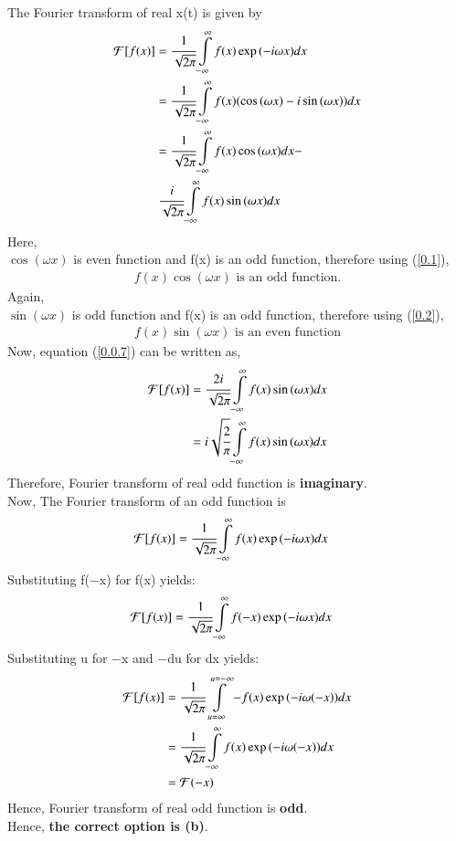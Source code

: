 \documentclass[journal,12pt,twocolumn]{IEEEtran}
\begin{document}
The Fourier transform of real x(t) is given by
\begin{align}
    \mathcal{F}[f(x)] &= \cfrac{1}{\sqrt{2\pi}}\displaystyle\int\limits_{-\infty}^{\infty} f(x)\exp{(-i\omega x)}dx\\
    &= \cfrac{1}{\sqrt{2\pi}}\displaystyle\int\limits_{-\infty}^{\infty} f(x)(\cos{(\omega x)} - i\sin{(\omega x)})dx\\
    &= \cfrac{1}{\sqrt{2\pi}}\displaystyle\int\limits_{-\infty}^{\infty} f(x)\cos{(\omega x)}dx -\nonumber \\ 
    &\text{ }\cfrac{i}{\sqrt{2\pi}}\displaystyle\int\limits_{-\infty}^{\infty} f(x)\sin{(\omega x)}dx \label{0.0.7}
\end{align}
Here, \\
$\cos{(\omega x)}$ is even function and f(x) is an odd function, therefore using (\ref{0.1}),
\begin{align}
    f(x)\cos{(\omega x)} \text{ is an odd function.}
\end{align}
Again,\\
$\sin{(\omega x)}$ is odd function and f(x) is an odd function, therefore using (\ref{0.2}),
\begin{align}
   f(x)\sin{(\omega x)} \text{ is an even function} 
\end{align}
Now, equation (\ref{0.0.7}) can be written as,
\begin{align}
    \mathcal{F}[f(x)] &= \cfrac{2i}{\sqrt{2\pi}}\displaystyle\int\limits_{-\infty}^{\infty} f(x)\sin{(\omega x)}dx\\
    &= i\sqrt{\cfrac{2}{\pi}}\displaystyle\int\limits_{-\infty}^{\infty} f(x)\sin{(\omega x)}dx
\end{align}
Therefore, Fourier transform of real odd function is \textbf{imaginary}.\\

Now,
The Fourier transform of an odd function is
\begin{align}
    \mathcal{F}[f(x)] &= \cfrac{1}{\sqrt{2\pi}}\displaystyle\int\limits_{-\infty}^{\infty} f(x)\exp{(-i\omega x)}dx
\end{align}
Substituting f(−x) for f(x) yields:
\begin{align}
    \mathcal{F}[f(x)] &= \cfrac{1}{\sqrt{2\pi}}\displaystyle\int\limits_{-\infty}^{\infty} f(-x)\exp{(-i\omega x)}dx    
\end{align}
Substituting u for −x and −du for dx yields:
\begin{align}
    \mathcal{F}[f(x)] &= \cfrac{1}{\sqrt{2\pi}}\displaystyle\int\limits_{u=\infty}^{u=-\infty} -f(x)\exp{(-i\omega (-x))}dx\\
    &= \cfrac{1}{\sqrt{2\pi}}\displaystyle\int\limits_{-\infty}^{\infty} f(x)\exp{(-i\omega (-x))}dx\\
    &= \mathcal{F}(-x)
\end{align}
Hence,  Fourier transform of real odd function is \textbf{odd}.\\
Hence, \textbf{the correct option is (b)}.
\begin{comment}
\begin{figure}[!ht]
\centering
\texttt{[image: pole\_plot.png]}
\caption{ROC for H(z)}
\end{figure}
\end{comment}
\end{document}
